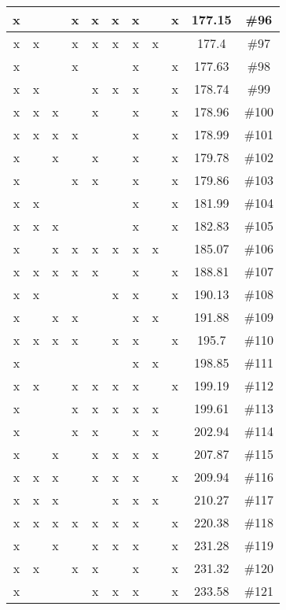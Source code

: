 \begin{center}
\begin{longtable}{|c|c|c|c|c|c|c|c|c|c|c|}
 x &  &  &  x &  x &  x &  x &  &  x & 177.15 & \#96 \\ \hline
 x &  x &  &  x &  x &  x &  x &  x &  & 177.4 & \#97 \\ \hline
 x &  &  &  x &  &  &  x &  &  x & 177.63 & \#98 \\ \hline
 x &  x &  &  &  x &  x &  x &  &  x & 178.74 & \#99 \\ \hline
 x &  x &  x &  &  x &  &  x &  &  x & 178.96 & \#100 \\ \hline
 x &  x &  x &  x &  &  &  x &  &  x & 178.99 & \#101 \\ \hline
 x &  &  x &  &  x &  &  x &  &  x & 179.78 & \#102 \\ \hline
 x &  &  &  x &  x &  &  x &  &  x & 179.86 & \#103 \\ \hline
 x &  x &  &  &  &  &  x &  &  x & 181.99 & \#104 \\ \hline
 x &  x &  x &  &  &  &  x &  &  x & 182.83 & \#105 \\ \hline
 x &  &  x &  x &  x &  x &  x &  x &  & 185.07 & \#106 \\ \hline
 x &  x &  x &  x &  x &  &  x &  &  x & 188.81 & \#107 \\ \hline
 x &  x &  &  &  &  x &  x &  &  x & 190.13 & \#108 \\ \hline
 x &  &  x &  x &  &  &  x &  x &  & 191.88 & \#109 \\ \hline
 x &  x &  x &  x &  &  x &  x &  &  x & 195.7 & \#110 \\ \hline
 x &  &  &  &  &  &  x &  x &  & 198.85 & \#111 \\ \hline
 x &  x &  &  x &  x &  x &  x &  &  x & 199.19 & \#112 \\ \hline
 x &  &  &  x &  x &  x &  x &  x &  & 199.61 & \#113 \\ \hline
 x &  &  &  x &  x &  &  x &  x &  & 202.94 & \#114 \\ \hline
 x &  &  x &  &  x &  x &  x &  x &  & 207.87 & \#115 \\ \hline
 x &  x &  x &  &  x &  x &  x &  &  x & 209.94 & \#116 \\ \hline
 x &  x &  x &  &  &  x &  x &  x &  & 210.27 & \#117 \\ \hline
 x &  x &  x &  x &  x &  x &  x &  &  x & 220.38 & \#118 \\ \hline
 x &  &  x &  &  x &  x &  x &  &  x & 231.28 & \#119 \\ \hline
 x &  x &  &  x &  x &  &  x &  &  x & 231.32 & \#120 \\ \hline
 x &  &  &  &  x &  x &  x &  &  x & 233.58 & \#121 \\ \hline

\end{longtable}
\end{center}
